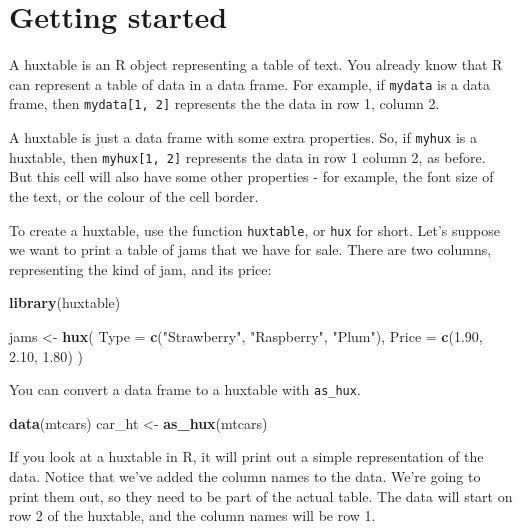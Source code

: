 \documentclass[]{article}
\newenvironment{Shaded}{\begin{snugshade}}{\end{snugshade}}
\newcommand{\DataTypeTok}[1]{\textcolor[rgb]{0.13,0.29,0.53}{#1}}
\newcommand{\FloatTok}[1]{\textcolor[rgb]{0.00,0.00,0.81}{#1}}
\newcommand{\KeywordTok}[1]{\textcolor[rgb]{0.13,0.29,0.53}{\textbf{#1}}}
\newcommand{\NormalTok}[1]{#1}
\newcommand{\StringTok}[1]{\textcolor[rgb]{0.31,0.60,0.02}{#1}}
\begin{document}
\FloatBarrier

\hypertarget{getting-started}{%
\section{Getting started}\label{getting-started}}

A huxtable is an R object representing a table of text. You already know
that R can represent a table of data in a data frame. For example, if
\texttt{mydata} is a data frame, then \texttt{mydata{[}1,\ 2{]}}
represents the the data in row 1, column 2.

A huxtable is just a data frame with some extra properties. So, if
\texttt{myhux} is a huxtable, then \texttt{myhux{[}1,\ 2{]}} represents
the data in row 1 column 2, as before. But this cell will also have some
other properties - for example, the font size of the text, or the colour
of the cell border.

To create a huxtable, use the function \texttt{huxtable}, or
\texttt{hux} for short. Let's suppose we want to print a table of jams
that we have for sale. There are two columns, representing the kind of
jam, and its price:

\begin{Shaded}
\begin{Highlighting}[]
\KeywordTok{library}\NormalTok{(huxtable)}
 
\NormalTok{jams <-}\StringTok{ }\KeywordTok{hux}\NormalTok{(}
        \DataTypeTok{Type  =} \KeywordTok{c}\NormalTok{(}\StringTok{"Strawberry"}\NormalTok{, }\StringTok{"Raspberry"}\NormalTok{, }\StringTok{"Plum"}\NormalTok{),}
        \DataTypeTok{Price =} \KeywordTok{c}\NormalTok{(}\FloatTok{1.90}\NormalTok{, }\FloatTok{2.10}\NormalTok{, }\FloatTok{1.80}\NormalTok{)}
\NormalTok{      )}
\end{Highlighting}
\end{Shaded}

\FloatBarrier

You can convert a data frame to a huxtable with \texttt{as\_hux}.

\begin{Shaded}
\begin{Highlighting}[]
\KeywordTok{data}\NormalTok{(mtcars)}
\NormalTok{car_ht <-}\StringTok{ }\KeywordTok{as_hux}\NormalTok{(mtcars)}
\end{Highlighting}
\end{Shaded}

\FloatBarrier

If you look at a huxtable in R, it will print out a simple
representation of the data. Notice that we've added the column names to
the data. We're going to print them out, so they need to be part of the
actual table. The data will start on row 2 of the huxtable, and the
column names will be row 1.
\end{document}
